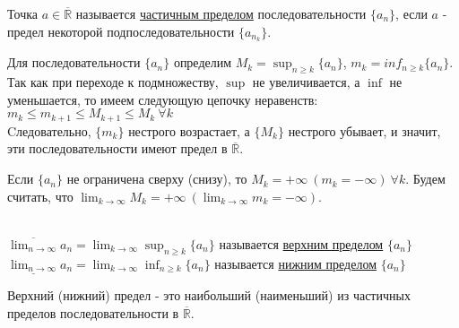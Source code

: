     \begin{definition}
        Точка $a \in \overline{\mathds{R}}$ называется \underline{частичным пределом} последовательности $\{a_{n}\}$, если $a$ - предел некоторой подпоследовательности $\{a_{n_{k}}\}$.
    \end{definition}

    Для последовательности $\{a_{n}\}$ определим $M_{k} = \sup_{n \geq k}\{a_{n}\}$, $m_{k} = inf_{n \geq k}\{a_{n}\}$. Так как при переходе к подмножеству, $\sup$ не увеличивается, а $\inf$ не уменьшается, то имеем следующую цепочку неравенств:\\
    $m_{k} \leq m_{k+1} \leq M_{k+1} \leq M_{k} \  \forall k$\\
    Cледовательно, $\{m_{k}\}$ нестрого возрастает, а $\{M_{k}\}$ нестрого убывает, и значит, эти последовательности имеют предел в $\overline{\mathds{R}}$.
    \begin{note}
        Если $\{a_{n}\}$ не ограничена сверху (снизу), то $M_{k} = +\infty \ (m_{k} = -\infty) \ \forall k$. Будем считать, что $\lim_{k \to \infty} M_{k} = +\infty \ (\lim_{k \to \infty} m_{k} = -\infty)$.
    \end{note}

    \begin{definition} \ \\
        $\overline{\lim_{n \to \infty}} a_{n} = \lim_{k \to \infty} \sup_{n \geq k}\{a_{n}\}$ называется \underline{верхним пределом} $\{a_{n}\}$\\
        $\underline{\lim_{n \to \infty}} a_{n} = \lim_{k \to \infty} \inf_{n \geq k}\{a_{n}\}$ называется \underline{нижним пределом} $\{a_{n}\}$\\
    \end{definition}

    \begin{theorem}
        Верхний (нижний) предел - это наибольший (наименьший) из частичных пределов последовательности в $\overline{\mathds{R}}$.
    \end{theorem}

